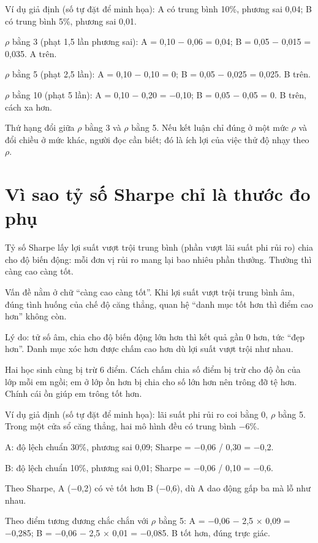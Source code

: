\begin{tcolorbox}[breakable]
Ví dụ giả định (số tự đặt để minh họa): A có trung bình 10\%, phương sai 0,04; B có trung bình 5\%, phương sai 0,01.

\(\rho\) bằng 3 (phạt 1,5 lần phương sai): A = 0,10 − 0,06 = 0,04; B = 0,05 − 0,015 = 0,035. A trên.

\(\rho\) bằng 5 (phạt 2,5 lần): A = 0,10 − 0,10 = 0; B = 0,05 − 0,025 = 0,025. B trên.

\(\rho\) bằng 10 (phạt 5 lần): A = 0,10 − 0,20 = −0,10; B = 0,05 − 0,05 = 0. B trên, cách xa hơn.
\end{tcolorbox}

Thứ hạng đổi giữa \(\rho\) bằng 3 và \(\rho\) bằng 5. Nếu kết luận chỉ đúng ở một mức \(\rho\) và đổi chiều ở mức khác, người đọc cần biết; đó là ích lợi của việc thử độ nhạy theo \(\rho\).

\section{Vì sao tỷ số Sharpe chỉ là thước đo phụ}

Tỷ số Sharpe lấy lợi suất vượt trội trung bình (phần vượt lãi suất phi rủi ro) chia cho độ biến động: mỗi đơn vị rủi ro mang lại bao nhiêu phần thưởng. Thường thì càng cao càng tốt.

Vấn đề nằm ở chữ “càng cao càng tốt”. Khi lợi suất vượt trội trung bình âm, đúng tình huống của chế độ căng thẳng, quan hệ “danh mục tốt hơn thì điểm cao hơn” không còn.

Lý do: tử số âm, chia cho độ biến động lớn hơn thì kết quả gần 0 hơn, tức “đẹp hơn”. Danh mục xóc hơn được chấm cao hơn dù lợi suất vượt trội như nhau.

Hai học sinh cùng bị trừ 6 điểm. Cách chấm chia số điểm bị trừ cho độ ồn của lớp mỗi em ngồi; em ở lớp ồn hơn bị chia cho số lớn hơn nên trông đỡ tệ hơn. Chính cái ồn giúp em trông tốt hơn.

\begin{tcolorbox}[breakable]
Ví dụ giả định (số tự đặt để minh họa): lãi suất phi rủi ro coi bằng 0, \(\rho\) bằng 5. Trong một cửa sổ căng thẳng, hai mô hình đều có trung bình −6\%.

A: độ lệch chuẩn 30\%, phương sai 0,09; Sharpe = −0,06 / 0,30 = −0,2.

B: độ lệch chuẩn 10\%, phương sai 0,01; Sharpe = −0,06 / 0,10 = −0,6.

Theo Sharpe, A (−0,2) có vẻ tốt hơn B (−0,6), dù A dao động gấp ba mà lỗ như nhau.

Theo điểm tương đương chắc chắn với \(\rho\) bằng 5: A = −0,06 − 2,5 × 0,09 = −0,285; B = −0,06 − 2,5 × 0,01 = −0,085. B tốt hơn, đúng trực giác.
\end{tcolorbox}

